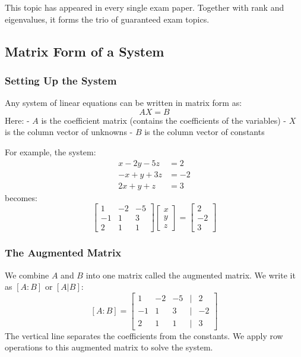 \documentclass[
]{article}
\begin{document}
This topic has appeared in every single exam paper. Together with rank
and eigenvalues, it forms the trio of guaranteed exam topics.

\subsection{Matrix Form of a System}\label{matrix-form-of-a-system}

\subsubsection{Setting Up the System}\label{setting-up-the-system}

Any system of linear equations can be written in matrix form as:
\[
AX = B
\]
Here: - \(A\) is the coefficient matrix (contains the coefficients of
the variables) - \(X\) is the column vector of unknowns - \(B\) is the
column vector of constants

For example, the system:
\[
\begin{aligned}
x - 2y - 5z &= 2 \\
-x + y + 3z &= -2 \\
2x + y + z &= 3
\end{aligned}
\]
becomes:
\[
\begin{bmatrix}
1 & -2 & -5 \\
-1 & 1 & 3 \\
2 & 1 & 1
\end{bmatrix} \begin{bmatrix} x \\ y \\ z \end{bmatrix} = \begin{bmatrix} 2 \\ -2 \\ 3 \end{bmatrix}
\]
\subsubsection{The Augmented Matrix}\label{the-augmented-matrix}

We combine \(A\) and \(B\) into one matrix called the augmented matrix.
We write it as \([A : B]\) or \([A \lvert  B]\):
\[
[A : B] =
\begin{bmatrix}
1 & -2 & -5 & | & 2 \\
-1 & 1 & 3 & | & -2 \\
2 & 1 & 1 & | & 3
\end{bmatrix}
\]
The vertical line separates the coefficients from the constants. We
apply row operations to this augmented matrix to solve the system.
\end{document}
